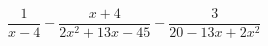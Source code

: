 \begin{ex}[type=equation]
	\begin{condition}
		$\dfrac{1}{x - 4} - \dfrac{x + 4}{2x^2 +13x - 45} - \dfrac{3}{20 - 13x + 2x^2}$
	\end{condition}
\end{ex}
